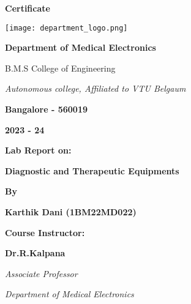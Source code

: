 \documentclass[a4paper, 12pt]{article}
\begin{document}
\begin{center}
    \LARGE \textbf{Certificate}
\end{center}

\vspace{0.5cm}

\begin{center}
    \texttt{[image: department\_logo.png]} %
\end{center}


\begin{center}
    \LARGE \textbf{Department of Medical Electronics}
\end{center}


\begin{center}
    \large B.M.S College of Engineering
\end{center}

\begin{center}
    \textit{Autonomous college, Affiliated to VTU Belgaum}
\end{center}

\begin{center}
    \textbf{Bangalore - 560019}
\end{center}

\begin{center}
    \textbf{2023 - 24}
\end{center}

\vspace{0.7cm}

\begin{center}
    \textbf{Lab Report on:}
\end{center}

\begin{center}
    \large \textbf{Diagnostic and Therapeutic Equipments}
\end{center}

\vspace{0.7cm}

\begin{center}
    \textbf{By}
\end{center}

\begin{center}
    \textbf{Karthik Dani (1BM22MD022)}
\end{center}

\vspace{0.1cm}

\begin{center}
    \large \textbf{Course Instructor:}
\end{center}

\begin{center}
    \textbf{Dr.R.Kalpana}
\end{center}

\begin{center}
    \textit{Associate Professor}
\end{center}

\begin{center}
     \textit{Department of Medical Electronics}
\end{center}
\end{document}
